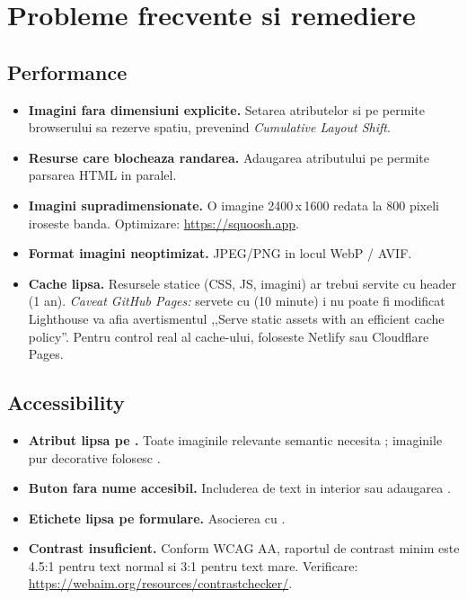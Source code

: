 \section{Probleme frecvente si remediere}

\subsection{Performance}

\begin{itemize}
  \item \textbf{Imagini fara dimensiuni explicite.} Setarea atributelor  si  pe  permite browserului sa rezerve spatiu, prevenind \emph{Cumulative Layout Shift}.
  \item \textbf{Resurse care blocheaza randarea.} Adaugarea atributului  pe  permite parsarea HTML in paralel.
  \item \textbf{Imagini supradimensionate.} O imagine 2400\,x\,1600 redata la 800 pixeli iroseste banda. Optimizare: \url{https://squoosh.app}.
  \item \textbf{Format imagini neoptimizat.} JPEG/PNG in locul WebP / AVIF.
  \item \textbf{Cache lipsa.} Resursele statice (CSS, JS, imagini) ar trebui servite cu header  (1 an). \emph{Caveat GitHub Pages:} servete cu  (10 minute) i nu poate fi modificat \textendash{} Lighthouse va afia avertismentul ,,Serve static assets with an efficient cache policy''. Pentru control real al cache-ului, foloseste Netlify sau Cloudflare Pages.
\end{itemize}

\subsection{Accessibility}

\begin{itemize}
  \item \textbf{Atribut  lipsa pe .} Toate imaginile relevante semantic necesita ; imaginile pur decorative folosesc .
  \item \textbf{Buton fara nume accesibil.} Includerea de text in interior sau adaugarea .
  \item \textbf{Etichete lipsa pe formulare.} Asocierea  cu .
  \item \textbf{Contrast insuficient.} Conform WCAG AA, raportul de contrast minim este 4.5:1 pentru text normal si 3:1 pentru text mare. Verificare: \url{https://webaim.org/resources/contrastchecker/}.
\end{itemize}

